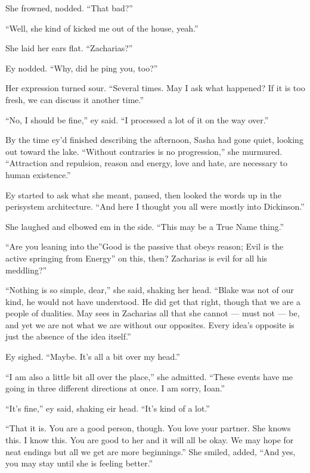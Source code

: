 She frowned, nodded. ``That bad?''

``Well, she kind of kicked me out of the house, yeah.''

She laid her ears flat. ``Zacharias?''

Ey nodded. ``Why, did he ping you, too?''

Her expression turned sour. ``Several times. May I ask what happened? If it is too fresh, we can discuss it another time.''

``No, I should be fine,'' ey said. ``I processed a lot of it on the way over.''

By the time ey'd finished describing the afternoon, Sasha had gone quiet, looking out toward the lake. ``Without contraries is no progression,'' she murmured. ``Attraction and repulsion, reason and energy, love and hate, are necessary to human existence.''

Ey started to ask what she meant, paused, then looked the words up in the perisystem architecture. ``And here I thought you all were mostly into Dickinson.''

She laughed and elbowed em in the side. ``This may be a True Name thing.''

``Are you leaning into the''Good is the passive that obeys reason; Evil is the active springing from Energy'' on this, then? Zacharias is evil for all his meddling?''

``Nothing is so simple, dear,'' she said, shaking her head. ``Blake was not of our kind, he would not have understood. He did get that right, though that we are a people of dualities. May sees in Zacharias all that she cannot — must not — be, and yet we are not what we are without our opposites. Every idea's opposite is just the absence of the idea itself.''

Ey sighed. ``Maybe. It's all a bit over my head.''

``I am also a little bit all over the place,'' she admitted. ``These events have me going in three different directions at once. I am sorry, Ioan.''

``It's fine,'' ey said, shaking eir head. ``It's kind of a lot.''

``That it is. You are a good person, though. You love your partner. She knows this. I know this. You are good to her and it will all be okay. We may hope for neat endings but all we get are more beginnings.'' She smiled, added, ``And yes, you may stay until she is feeling better.''
